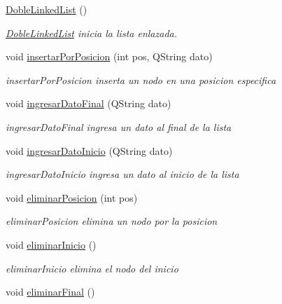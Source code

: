 \begin{DoxyCompactItemize}
\item 
\mbox{\hyperlink{class_doble_linked_list_ae9672b17f11b4594112e9aa0166564ba}{Doble\+Linked\+List}} ()
\begin{DoxyCompactList}\small\item\em \mbox{\hyperlink{class_doble_linked_list}{Doble\+Linked\+List}} inicia la lista enlazada. \end{DoxyCompactList}\item 
void \mbox{\hyperlink{class_doble_linked_list_a856a0628fb4f272a1609fd8e74b2106a}{insertar\+Por\+Posicion}} (int pos, Q\+String dato)
\begin{DoxyCompactList}\small\item\em insertar\+Por\+Posicion inserta un nodo en una posicion especifica \end{DoxyCompactList}\item 
void \mbox{\hyperlink{class_doble_linked_list_ac44b598ebe998d0790ec6aabbef016cf}{ingresar\+Dato\+Final}} (Q\+String dato)
\begin{DoxyCompactList}\small\item\em ingresar\+Dato\+Final ingresa un dato al final de la lista \end{DoxyCompactList}\item 
void \mbox{\hyperlink{class_doble_linked_list_af49aa0301c35e55c3f49a449375fd031}{ingresar\+Dato\+Inicio}} (Q\+String dato)
\begin{DoxyCompactList}\small\item\em ingresar\+Dato\+Inicio ingresa un dato al inicio de la lista \end{DoxyCompactList}\item 
void \mbox{\hyperlink{class_doble_linked_list_a331b1301572bb83ea836c64992723420}{eliminar\+Posicion}} (int pos)
\begin{DoxyCompactList}\small\item\em eliminar\+Posicion elimina un nodo por la posicion \end{DoxyCompactList}\item 
void \mbox{\hyperlink{class_doble_linked_list_af14d0ac70aae1708467c95320d383ab3}{eliminar\+Inicio}} ()
\begin{DoxyCompactList}\small\item\em eliminar\+Inicio elimina el nodo del inicio \end{DoxyCompactList}\item 
void \mbox{\hyperlink{class_doble_linked_list_ab25d313f8f62c896e4d2e7f37be11e5b}{eliminar\+Final}} ()

\end{DoxyCompactItemize}
